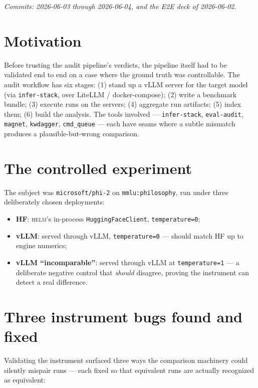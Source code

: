 \documentclass[11pt]{report}
\newcommand{\code}[1]{\texttt{#1}}
\begin{document}
\emph{Commits: 2026-06-03 through 2026-06-04, and the E2E deck of 2026-06-02.}

\section{Motivation}

Before trusting the audit pipeline's verdicts, the pipeline itself had to be
validated end to end on a case where the ground truth was controllable. The
audit workflow has six stages: (1) stand up a vLLM server for the target model
(via \code{infer-stack}, over LiteLLM / docker-compose); (2) write a benchmark
bundle; (3) execute runs on the servers; (4) aggregate run artifacts; (5) index
them; (6) build the analysis. The tools involved --- \code{infer-stack},
\code{eval-audit}, \code{magnet}, \code{kwdagger}, \code{cmd\_queue} --- each have
seams where a subtle mismatch produces a plausible-but-wrong comparison.

\section{The controlled experiment}

The subject was \code{microsoft/phi-2} on \code{mmlu:philosophy}, run under three
deliberately chosen deployments:

\begin{itemize}[nosep]
  \item \textbf{HF}: \textsc{helm}'s in-process \code{HuggingFaceClient},
        \code{temperature=0};
  \item \textbf{vLLM}: served through vLLM, \code{temperature=0} --- should match
        HF up to engine numerics;
  \item \textbf{vLLM ``incomparable''}: served through vLLM at \code{temperature=1}
        --- a deliberate negative control that \emph{should} disagree, proving the
        instrument can detect a real difference.
\end{itemize}

\section{Three instrument bugs found and fixed}

Validating the instrument surfaced three ways the comparison machinery could
silently mispair runs --- each fixed so that equivalent runs are actually
recognized as equivalent:
\end{document}
